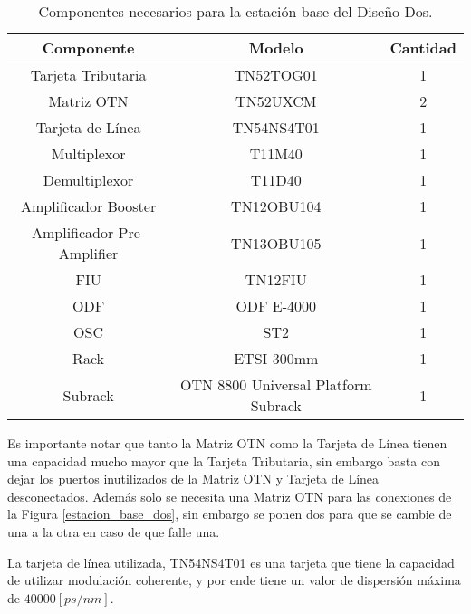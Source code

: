 \documentclass[letterpaper,11pt]{article} %
\begin{document}
\begin{table}[H]
\begin{tabular}{|c|c|c|}
\hline
\textbf{Componente}        & \textbf{Modelo} & \textbf{Cantidad} \\ \hline
Tarjeta Tributaria         & TN52TOG01       & 1                 \\ \hline
Matriz OTN                 & TN52UXCM        & 2                 \\ \hline
Tarjeta de Línea           & TN54NS4T01      & 1                 \\ \hline
Multiplexor                & T11M40          & 1                 \\ \hline
Demultiplexor              & T11D40          & 1                 \\ \hline
Amplificador Booster       & TN12OBU104      & 1                 \\ \hline
Amplificador Pre-Amplifier & TN13OBU105      & 1                 \\ \hline
FIU                        & TN12FIU         & 1                 \\ \hline
ODF                        & ODF E-4000      & 1                 \\ \hline
OSC                        & ST2             & 1                 \\ \hline
Rack                       &   ETSI 300mm              &   1                \\ \hline
Subrack                    &      OTN 8800 Universal Platform Subrack           & 1                  \\ \hline
\end{tabular}
\caption{Componentes necesarios para la estación base del Diseño Dos.}
\end{table}

Es importante notar que tanto la Matriz OTN como la Tarjeta de Línea tienen una capacidad mucho mayor que la Tarjeta Tributaria, sin embargo basta con dejar los puertos inutilizados de la Matriz OTN y Tarjeta de Línea desconectados. Además solo se necesita una Matriz OTN para las conexiones de la Figura \ref{estacion_base_dos}, sin embargo se ponen dos para que se cambie de una a la otra en caso de que falle una.

\newp
La tarjeta de línea utilizada, TN54NS4T01 es una tarjeta que tiene la capacidad de utilizar modulación coherente, y por ende tiene un valor de dispersión máxima de $40000[ps/nm]$.
\end{document}
